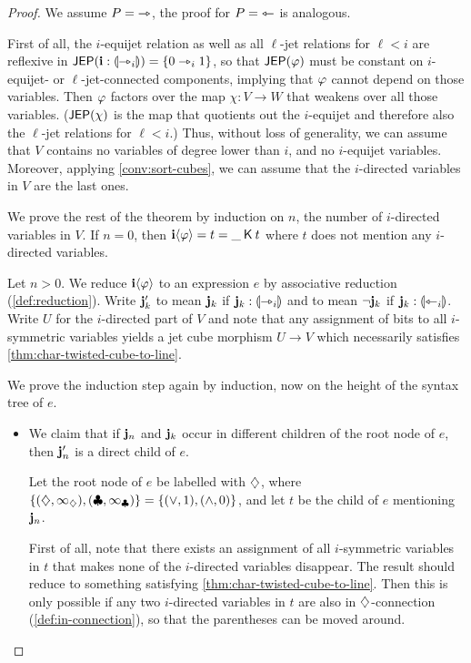 \documentclass[a4paper]{memoir}
\begin{document}
\begin{proof}
	We assume $P = {\rightarrowtriangle}$, the proof for $P = {\leftarrowtriangle}$ is analogous.

	First of all, the $i$-equijet relation as well as all $\ell$-jet relations for $\ell < i$ are reflexive in $\mathsf{JEP}(\mathbf{i} : {\llparenthesis \rightarrowtriangle_i \rrparenthesis}) = \mathopen{}\left\{ 0 \rightarrowtriangle_i 1 \right\}\mathclose{}$, so that $\mathsf{JEP}(\varphi)$ must be constant on $i$-equijet- or $\ell$-jet-connected components, implying that $\varphi$ cannot depend on those variables.
	Then $\varphi$ factors over the map $\chi : V \to W$ that weakens over all those variables.
	($\mathsf{JEP}(\chi)$ is the map that quotients out the $i$-equijet and therefore also the $\ell$-jet relations for $\ell < i$.)
	Thus, without loss of generality, we can assume that $V$ contains no variables of degree lower than $i$, and no $i$-equijet variables.
	Moreover, applying \cref{conv:sort-cubes}, we can assume that the $i$-directed variables in $V$ are the last ones.
	
	We prove the rest of the theorem by induction on $n$, the number of $i$-directed variables in $V$.
	If $n = 0$, then $\mathbf{i} \langle \varphi \rangle = t = \_ \mathbin{\mathsf{K}} t$ where $t$ does not mention any $i$-directed variables.
	
	Let $n > 0$.
	We reduce $\mathbf{i} \langle \varphi \rangle$ to an expression $e$ by associative reduction (\cref{def:reduction}).
	Write $\mathbf{j}_k'$ to mean $\mathbf{j}_k$ if $\mathbf{j}_k : {\llparenthesis \rightarrowtriangle_i \rrparenthesis}$ and to mean $\lnot \mathbf{j}_k$ if $\mathbf{j}_k : {\llparenthesis \leftarrowtriangle_i \rrparenthesis}$.
	Write $U$ for the $i$-directed part of $V$ and note that any assignment of bits to all $i$-symmetric variables yields a jet cube morphism $U \to V$ which necessarily satisfies \cref{thm:char-twisted-cube-to-line}.
	
	We prove the induction step again by induction, now on the height of the syntax tree of $e$.
	
	\begin{itemize}
		\item We claim that if $\mathbf{j}_n$ and $\mathbf{j}_{k}$ occur in different children of the root node of $e$, then $\mathbf{j}'_n$ is a direct child of $e$.
		
		Let the root node of $e$ be labelled with $\mathbin{\diamondsuit}$, where $\mathopen{}\left\{ (\mathbin{\diamondsuit}, \infty_{\mathbin{\diamondsuit}}), (\mathbin{\clubsuit}, \infty_{\mathbin{\clubsuit}}) \right\}\mathclose{} = \mathopen{}\left\{ (\vee, 1), (\wedge, 0) \right\}\mathclose{}$, and let $t$ be the child of $e$ mentioning $\mathbf{j}_n$.
		
		First of all, note that there exists an assignment of all $i$-symmetric variables in $t$ that makes none of the $i$-directed variables disappear.
		The result should reduce to something satisfying \cref{thm:char-twisted-cube-to-line}.
		Then this is only possible if any two $i$-directed variables in $t$ are also in $\mathbin{\diamondsuit}$-connection (\cref{def:in-connection}), so that the parentheses can be moved around.
		

\end{itemize}
\end{proof}
\end{document}
